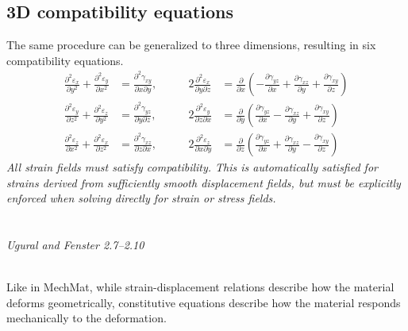 ﻿\documentclass[12pt]{article}
\begin{document}
\subsection*{3D compatibility equations}
The same procedure can be generalized to three dimensions, resulting in six compatibility equations.
\[
\boxed{\begin{aligned}
\frac{\partial^2\varepsilon_x}{\partial y^2}
+\frac{\partial^2\varepsilon_y}{\partial x^2}
&=\frac{\partial^2\gamma_{xy}}{\partial x\partial y},
\qquad&
2\frac{\partial^2\varepsilon_x}{\partial y\partial z}
&=\frac{\partial}{\partial x}
\left(
-\frac{\partial\gamma_{yz}}{\partial x}
+\frac{\partial\gamma_{xz}}{\partial y}
+\frac{\partial\gamma_{xy}}{\partial z}
\right)
\\[10pt]
\frac{\partial^2\varepsilon_y}{\partial z^2}
+\frac{\partial^2\varepsilon_z}{\partial y^2}
&=\frac{\partial^2\gamma_{yz}}{\partial y\partial z},
\qquad&
2\frac{\partial^2\varepsilon_y}{\partial z\partial x}
&=\frac{\partial}{\partial y}
\left(
\frac{\partial\gamma_{yz}}{\partial x}
-\frac{\partial\gamma_{xz}}{\partial y}
+\frac{\partial\gamma_{xy}}{\partial z}
\right)
\\[10pt]
\frac{\partial^2\varepsilon_z}{\partial x^2}
+\frac{\partial^2\varepsilon_x}{\partial z^2}
&=\frac{\partial^2\gamma_{xz}}{\partial z\partial x},
\qquad&
2\frac{\partial^2\varepsilon_z}{\partial x\partial y}
&=\frac{\partial}{\partial z}
\left(
\frac{\partial\gamma_{yz}}{\partial x}
+\frac{\partial\gamma_{xz}}{\partial y}
-\frac{\partial\gamma_{xy}}{\partial z}
\right)
\end{aligned}}
\]
\textit{All strain fields must satisfy compatibility. This is automatically satisfied for strains derived from sufficiently smooth displacement fields, but must be explicitly enforced when solving directly for strain or stress fields.}
\section*{}
\vspace{-0.5em}
{\small\textit{Ugural and Fenster 2.7--2.10}}
\\
Like in MechMat, while strain-displacement relations describe how the material deforms geometrically, constitutive equations describe how the material responds mechanically to the deformation.
\end{document}
